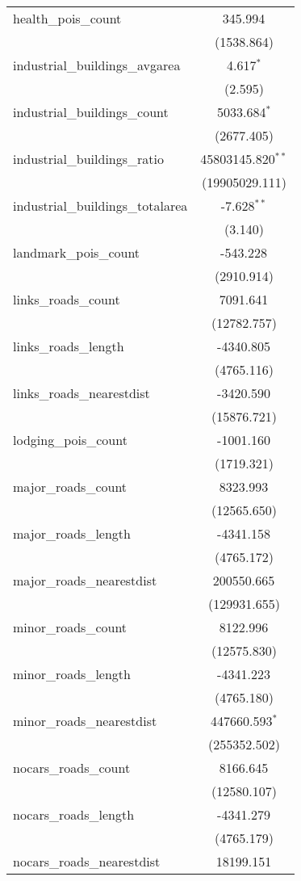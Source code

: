 \begin{table}[!htbp]
\begin{tabular}{@{\extracolsep{5pt}}lc}
 health_pois_count & 345.994$^{}$ \\
  & (1538.864) \\
 industrial_buildings_avgarea & 4.617$^{*}$ \\
  & (2.595) \\
 industrial_buildings_count & 5033.684$^{*}$ \\
  & (2677.405) \\
 industrial_buildings_ratio & 45803145.820$^{**}$ \\
  & (19905029.111) \\
 industrial_buildings_totalarea & -7.628$^{**}$ \\
  & (3.140) \\
 landmark_pois_count & -543.228$^{}$ \\
  & (2910.914) \\
 links_roads_count & 7091.641$^{}$ \\
  & (12782.757) \\
 links_roads_length & -4340.805$^{}$ \\
  & (4765.116) \\
 links_roads_nearestdist & -3420.590$^{}$ \\
  & (15876.721) \\
 lodging_pois_count & -1001.160$^{}$ \\
  & (1719.321) \\
 major_roads_count & 8323.993$^{}$ \\
  & (12565.650) \\
 major_roads_length & -4341.158$^{}$ \\
  & (4765.172) \\
 major_roads_nearestdist & 200550.665$^{}$ \\
  & (129931.655) \\
 minor_roads_count & 8122.996$^{}$ \\
  & (12575.830) \\
 minor_roads_length & -4341.223$^{}$ \\
  & (4765.180) \\
 minor_roads_nearestdist & 447660.593$^{*}$ \\
  & (255352.502) \\
 nocars_roads_count & 8166.645$^{}$ \\
  & (12580.107) \\
 nocars_roads_length & -4341.279$^{}$ \\
  & (4765.179) \\
 nocars_roads_nearestdist & 18199.151$^{}$ \\

\end{tabular}
\end{table}
